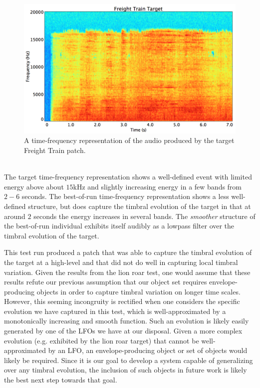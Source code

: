 \documentclass[12pt]{report} 	%
\numberwithin{figure}{chapter}
\numberwithin{table}{chapter}
\numberwithin{equation}{chapter}
\begin{document}
\begin{flushleft}
\begin{figure}[h!]
\begin{center}
\includegraphics[scale=0.34]{FreightTrainTargetSTFT}
\caption[Target freight train time-frequency representation]{A time-frequency representation of the audio produced by the target Freight Train patch.}
\end{center}
\end{figure}
\\
The target time-frequency representation shows a well-defined event with limited \clearpage
\noindent energy above about $15$kHz and slightly increasing energy in a few bands from $2-6$ seconds. The best-of-run time-frequency representation shows a less well-defined structure, but does capture the timbral evolution of the target in that at around $2$ seconds the energy increases in several bands. The \textit{smoother} structure of the best-of-run individual exhibits itself audibly as a lowpass filter over the timbral evolution of the target.

This test run produced a patch that was able to capture the timbral evolution of the target at a high-level and that did not do well in capturing local timbral variation. Given the results from the lion roar test, one would assume that these results refute our previous assumption that our object set requires envelope-producing objects in order to capture timbral variation on longer time scales. However, this seeming incongruity is rectified when one considers the specific evolution we have captured in this test, which is well-approximated by a monotonically increasing and smooth function. Such an evolution is likely easily generated by one of the LFOs we have at our disposal. Given a more complex evolution (e.g. exhibited by the lion roar target) that cannot be well-approximated by an LFO, an envelope-producing object or set of objects would likely be required. Since it is our goal to develop a system capable of generalizing over any timbral evolution, the inclusion of such objects in future work is likely the best next step towards that goal.


\end{flushleft}
\end{document}
